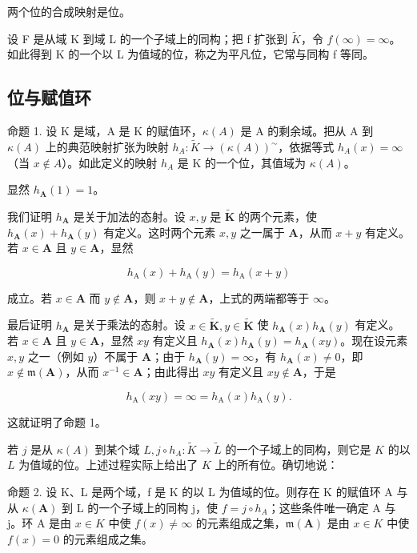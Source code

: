 两个位的合成映射是位。

设 F 是从域 K 到域 L 的一个子域上的同构；把 f 扩张到 \(\tilde{K}\)，令 \(f(\infty) = \infty\)。如此得到 K 的一个以 L 为值域的位，称之为平凡位，它常与同构 f 等同。

\subsection{位与赋值环}

命题 1. 设 K 是域，A 是 K 的赋值环，\(\kappa(A)\) 是 A 的剩余域。把从 A 到 \(\kappa(A)\) 上的典范映射扩张为映射 \(h_{A}: \tilde{K} \to (\kappa(A))^{\sim}\)，依据等式 \(h_{A}(x) = \infty\)（当 \(x \notin A\)）。如此定义的映射 \(h_{A}\) 是 K 的一个位，其值域为 \(\kappa(A)\)。

显然 \(h_{\mathbf{A}}(1) = 1\)。

我们证明 \(h_{\mathbf{A}}\) 是关于加法的态射。设 \(x, y\) 是 \(\tilde{\mathbf{K}}\) 的两个元素，使 \(h_{\mathbf{A}}(x) + h_{\mathbf{A}}(y)\) 有定义。这时两个元素 \(x, y\) 之一属于 \(\mathbf{A}\)，从而 \(x + y\) 有定义。若 \(x \in \mathbf{A}\) 且 \(y \in \mathbf{A}\)，显然

\[
h _ {\mathrm{A}} (x) + h _ {\mathrm{A}} (y) = h _ {\mathrm{A}} (x + y)
\]

成立。若 \(x \in \mathbf{A}\) 而 \(y \notin \mathbf{A}\)，则 \(x + y \notin \mathbf{A}\)，上式的两端都等于 \(\infty\)。

最后证明 \(h_{\mathbf{A}}\) 是关于乘法的态射。设 \(x \in \tilde{\mathbf{K}}, y \in \tilde{\mathbf{K}}\) 使 \(h_{\mathbf{A}}(x)h_{\mathbf{A}}(y)\) 有定义。若 \(x \in \mathbf{A}\) 且 \(y \in \mathbf{A}\)，显然 \(xy\) 有定义且 \(h_{\mathbf{A}}(x)h_{\mathbf{A}}(y) = h_{\mathbf{A}}(xy)\)。现在设元素 \(x, y\) 之一（例如 \(y\)）不属于 \(\mathbf{A}\)；由于 \(h_{\mathbf{A}}(y) = \infty\)，有 \(h_{\mathbf{A}}(x) \neq 0\)，即 \(x \notin \mathfrak{m}(\mathbf{A})\)，从而 \(x^{-1} \in \mathbf{A}\)；由此得出 \(xy\) 有定义且 \(xy \notin \mathbf{A}\)，于是

\[
h _ {\mathrm{A}} (x y) = \infty = h _ {\mathrm{A}} (x) h _ {\mathrm{A}} (y).
\]

这就证明了命题 1。

若 \(j\) 是从 \(\kappa(A)\) 到某个域 \(L, j \circ h_{A}: \tilde{K} \to \tilde{L}\) 的一个子域上的同构，则它是 \(K\) 的以 \(L\) 为值域的位。上述过程实际上给出了 \(K\) 上的所有位。确切地说：

命题 2. 设 K、L 是两个域，f 是 K 的以 L 为值域的位。则存在 K 的赋值环 A 与从 \(\kappa(\mathbf{A})\) 到 L 的一个子域上的同构 j，使 \(f = j \circ h_{A}\)；这些条件唯一确定 A 与 j。环 A 是由 \(x \in K\) 中使 \(f(x) \neq \infty\) 的元素组成之集，\(\mathfrak{m}(\mathbf{A})\) 是由 \(x \in K\) 中使 \(f(x) = 0\) 的元素组成之集。

